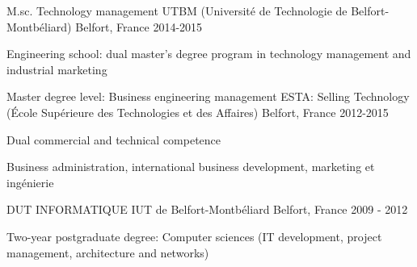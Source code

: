 

\begin{cventries}

  \cventry
    {M.sc. Technology management} %
    {UTBM (Université de Technologie de Belfort-Montbéliard)} %
    {Belfort, France} %
    {2014-2015} %
    {
      \begin{cvitems} %
        \item {Engineering school: dual master’s degree program in technology management and industrial marketing}
      \end{cvitems}
    }
    
  \cventry
    {Master degree level: Business engineering management} %
    {ESTA: Selling Technology (École Supérieure des Technologies et des Affaires)} %
    {Belfort, France} %
    {2012-2015} %
    {
      \begin{cvitems} %
        \item {Dual commercial and technical competence}
        \item {Business administration, international business development, marketing et ingénierie}
      \end{cvitems}
    }

  \cventry
    {DUT INFORMATIQUE} %
    {IUT de Belfort-Montbéliard} %
    {Belfort, France} %
    {2009 - 2012} %
    {
      \begin{cvitems} %
        \item {Two-year postgraduate degree: Computer sciences (IT development, project management, architecture and networks)}
      \end{cvitems}
    }


\end{cventries}
